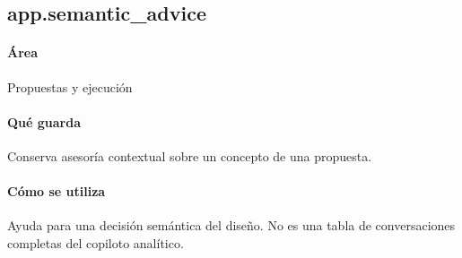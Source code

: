 \subsection{app.semantic\_\allowbreak{}advice}
\paragraph{Área} Propuestas y ejecución

\paragraph{Qué guarda} Conserva asesoría contextual sobre un concepto de una propuesta.

\paragraph{Cómo se utiliza} Ayuda para una decisión semántica del diseño. No es una tabla de conversaciones completas del copiloto analítico.

